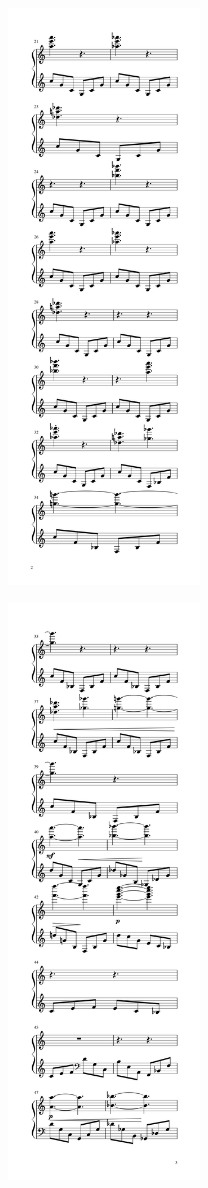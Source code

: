 \begin{rightcolumn*}
\noindent\includegraphics[width=2in]{assets/static/miniatures/4-2.png}

\noindent\includegraphics[width=2in]{assets/static/miniatures/4-3.png}


\end{rightcolumn*}
